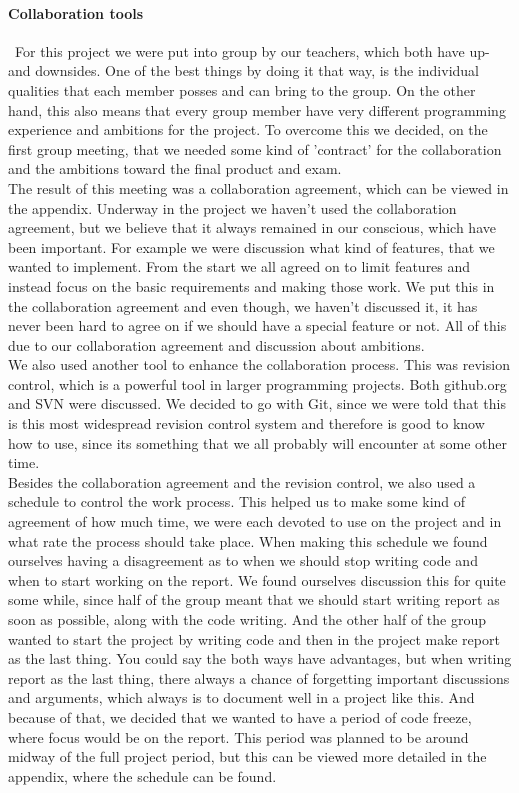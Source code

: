 \documentclass[a4paper,10pt,titlepage]{article}
\begin{document}
	\paragraph{Collaboration tools}\mbox{}\
	For this project we were put into group by our teachers, which both have up- and downsides. One of the best things by doing it that way, is the individual qualities that each member posses and can bring to the group. On the other hand, this also means that every group member have very different programming experience and ambitions for the project. To overcome this we decided, on the first group meeting, that we needed some kind of 'contract' for the collaboration and the ambitions toward the final product and exam.\\ The result of this meeting was a collaboration agreement, which can be viewed in the appendix. Underway in the project we haven't used the collaboration agreement, but we believe that it always remained in our conscious, which have been important. For example we were discussion what kind of features, that we wanted to implement. From the start we all agreed on to limit features and instead focus on the basic requirements and making those work. We put this in the collaboration agreement and even though, we haven't discussed it, it has never been hard to agree on if we should have a special feature or not. All of this due to our collaboration agreement and discussion about ambitions.\\
		We also used another tool to enhance the collaboration process. This was revision control, which is a powerful tool in larger programming projects. Both github.org and SVN were discussed. We decided to go with Git, since we were told that this is this most widespread revision control system and therefore is good to know how to use, since its something that we all probably will encounter at some other time.\\
		Besides the collaboration agreement and the revision control, we also used a schedule to control the work process. This helped us to make some kind of agreement of how much time, we were each devoted to use on the project and in what rate the process should take place. When making this schedule we found ourselves having a disagreement as to when we should stop writing code and when to start working on the report. We found ourselves discussion this for quite some while, since half of the group meant that we should start writing report as soon as possible, along with the code writing. And the other half of the group wanted to start the project by writing code and then in the project make report as the last thing. You could say the both ways have advantages, but when writing report as the last thing, there always a chance of forgetting important discussions and arguments, which always is to document well in a project like this. And because of that, we decided that we wanted to have a period of code freeze, where focus would be on the report. This period was planned to be around midway of the full project period, but this can be viewed more detailed in the appendix, where the schedule can be found.\\
		
\end{document}
